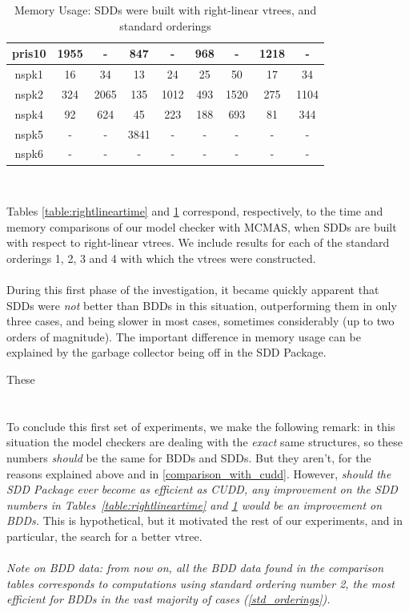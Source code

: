 \documentclass[11pt]{report}
\begin{document}
\begin{table}
\begin{tabular}{|*{9}{c|}}
pris10 & 1955 & - & 847 & - & 968 & - & 1218 & -\\ \hline
nspk1 & 16 & 34 & 13 & 24 & 25 & 50 & 17 & 34 \\ \hline
nspk2 & 324 & 2065 & 135 & 1012 & 493 & 1520 & 275 & 1104 \\ \hline
nspk4 & 92 & 624 & 45 & 223  & 188 & 693 & 81 & 344 \\ \hline
nspk5 & - & - & 3841 & - & - & - & - & -\\ \hline
nspk6 & -&- &- &-  &- &- &- &- \\ \hline
\end{tabular}
\\
\caption{Memory Usage: SDDs were built with right-linear vtrees, and standard orderings}
\label{table:rightlinearmemory}
\end{table}
 
Tables \ref{table:rightlineartime} and \ref{table:rightlinearmemory} correspond, respectively, to the time and memory comparisons of our model checker with MCMAS, when SDDs are built with respect to right-linear vtrees. We include results for each of the standard orderings 1, 2, 3 and 4 with which the vtrees were constructed. 
\\\\
During this first phase of the investigation, it became quickly apparent that SDDs were \textit{not }better than BDDs in this situation, outperforming them in only three cases, and being slower in most cases, sometimes considerably (up to two orders of magnitude). The important difference in memory usage can be explained by the garbage collector being off in the SDD Package. 

These 
\\\\\\

To conclude this first set of experiments, we make the following remark: in this situation the model checkers are dealing with the \textit{exact} same structures, so these numbers \textit{should }be the same for BDDs and SDDs. But they aren't, for the reasons explained above and in \ref{comparison_with_cudd}. However, \textit{should the SDD Package ever become as efficient as CUDD, any improvement on the SDD numbers in Tables~\ref{table:rightlineartime} and \ref{table:rightlinearmemory} would be an improvement on BDDs.} This is hypothetical, but it motivated the rest of our experiments, and in particular, the search for a better vtree.
\\\\
\textit{Note on BDD data: from now on, all the BDD data found in the comparison tables corresponds to computations using standard ordering number 2, the most efficient for BDDs in the vast majority of cases (\ref{std_orderings}).
}
\end{document}
